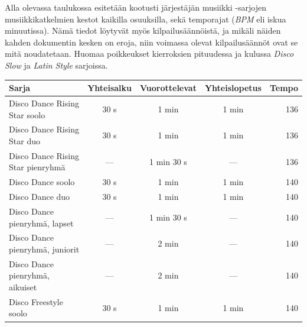 \documentclass[12pt, a4paper, oneside]{article}
\begin{document}
Alla olevassa taulukossa esitetään kootusti järjestäjän musiikki -sarjojen musiikkikatkelmien kestot kaikilla osuuksilla,
sekä temporajat (\textit{BPM} eli iskua minuutissa).
Nämä tiedot löytyvät myös kilpailusäännöistä,
ja mikäli näiden kahden dokumentin kesken on eroja,
niin voimassa olevat kilpailusäännöt ovat se mitä noudatetaan.
Huomaa poikkeukset kierroksien pituudessa ja kulussa \textit{Disco Slow} ja \textit{Latin Style} sarjoissa.
\begin{table}[ht]
    \centering
    \setlength\tabcolsep{9pt}
    \small
    \renewcommand{\arraystretch}{1.5}
    \begin{tabular}{@{\hspace{0.25cm}}lcccr@{\hspace{0.25cm}}}
        \toprule
        \textbf{Sarja}                                  & \textbf{Yhteisalku} & \textbf{Vuorottelevat} & \textbf{Yhteislopetus} & \textbf{Tempo} \\ \midrule
        Disco Dance Rising Star soolo                   & 30 s                & 1 min                  & 1 min                  & 136            \\
        Disco Dance Rising Star duo                     & 30 s                & 1 min                  & 1 min                  & 136            \\
        Disco Dance Rising Star pienryhmä               & ---                 & 1 min 30 s             & ---                    & 136            \\
        Disco Dance soolo                               & 30 s                & 1 min                  & 1 min                  & 140            \\
        Disco Dance duo                                 & 30 s                & 1 min                  & 1 min                  & 140            \\
        Disco Dance pienryhmä, lapset                   & ---                 & 1 min 30 s             & ---                    & 140            \\
        Disco Dance pienryhmä, juniorit                 & ---                 & 2 min                  & ---                    & 140            \\
        Disco Dance pienryhmä, aikuiset                 & ---                 & 2 min                  & ---                    & 140            \\
        Disco Freestyle soolo                           & 30 s                & 1 min                  & 1 min                  & 140            \\

\end{tabular}
\end{table}
\end{document}
